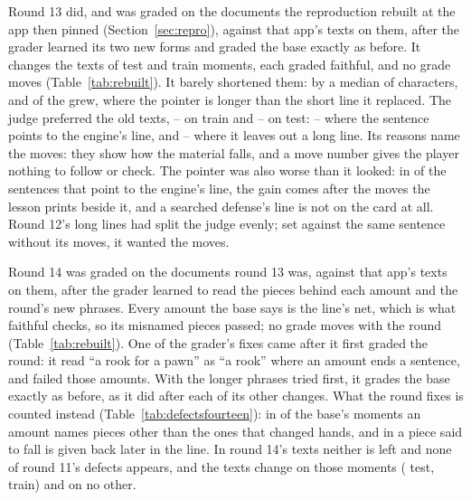 \documentclass[11pt]{article}
\begin{document}
Round 13 did, and was graded on the documents the reproduction rebuilt at the app then pinned
(Section~\ref{sec:repro}), against that app's texts on them, after the grader learned its two
new forms and graded the base exactly as before. It changes the texts of
\RoundThirteenChangedTest{} test and \RoundThirteenChangedTrain{} train moments, each graded
faithful, and no grade moves (Table~\ref{tab:rebuilt}). It barely shortened them: by a median of
\RoundThirteenMedianCut{} characters, and \RoundThirteenGrew{} of the \RoundThirteenJudged{} grew,
where the pointer is longer than the short line it replaced. The judge preferred the old texts,
\RoundThirteenTrainNew--\RoundThirteenTrainOld{} on train and
\RoundThirteenTestNew--\RoundThirteenTestOld{} on test: \RoundThirteenPointerNew--\RoundThirteenPointerOld{}
where the sentence points to the engine's line, and \RoundThirteenLongNew--\RoundThirteenLongOld{}
where it leaves out a long line. Its reasons name the moves: they show how the material falls, and
a move number gives the player nothing to follow or check. The pointer was also worse than it
looked: in \RoundThirteenPastLine{} of the \RoundThirteenPointerCases{} sentences that point to the
engine's line, the gain comes after the moves the lesson prints beside it, and a searched defense's
line is not on the card at all. Round 12's long lines had split the judge evenly; set against the
same sentence without its moves, it wanted the moves.

Round 14 was graded on the documents round 13 was, against that app's texts on them, after
the grader learned to read the pieces behind each amount and the round's new phrases. Every
amount the base says is the line's net, which is what faithful checks, so its misnamed pieces
passed; no grade moves with the round (Table~\ref{tab:rebuilt}). One of the grader's fixes came
after it first graded the round: it read ``a rook for a pawn'' as ``a rook'' where an amount ends
a sentence, and failed those amounts. With the longer phrases tried first, it grades the base
exactly as before, as it did after each of its other changes. What the round fixes is counted
instead (Table~\ref{tab:defectsfourteen}): in \RoundFourteenAmountMoments{} of the base's moments
an amount names pieces other than the ones that changed hands, and in
\RoundFourteenFallenMoments{} a piece said to fall is given back later in the line. In round 14's
texts neither is left and none of round 11's defects appears, and the texts change on those
\RoundFourteenDefectMoments{} moments (\RoundFourteenChangedTest{} test,
\RoundFourteenChangedTrain{} train) and on no other.
\end{document}

